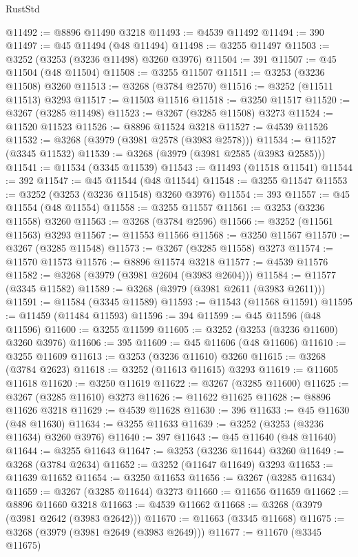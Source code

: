 \begin{lexlean}{RustStd}
\begin{coremodule}
@11492 := @8896 @11490 @3218
@11493 := @4539 @11492
@11494 := 390
@11497 := @45 @11494 (@48 @11494)
@11498 := @3255 @11497
@11503 := @3252 (@3253 (@3236 @11498) @3260 @3976)
@11504 := 391
@11507 := @45 @11504 (@48 @11504)
@11508 := @3255 @11507
@11511 := @3253 (@3236 @11508) @3260
@11513 := @3268 (@3784 @2570)
@11516 := @3252 (@11511 @11513) @3293
@11517 := @11503 @11516
@11518 := @3250 @11517
@11520 := @3267 (@3285 @11498)
@11523 := @3267 (@3285 @11508) @3273
@11524 := @11520 @11523
@11526 := @8896 @11524 @3218
@11527 := @4539 @11526
@11532 := @3268 (@3979 (@3981 @2578 (@3983 @2578)))
@11534 := @11527 (@3345 @11532)
@11539 := @3268 (@3979 (@3981 @2585 (@3983 @2585)))
@11541 := @11534 (@3345 @11539)
@11543 := @11493 (@11518 @11541)
@11544 := 392
@11547 := @45 @11544 (@48 @11544)
@11548 := @3255 @11547
@11553 := @3252 (@3253 (@3236 @11548) @3260 @3976)
@11554 := 393
@11557 := @45 @11554 (@48 @11554)
@11558 := @3255 @11557
@11561 := @3253 (@3236 @11558) @3260
@11563 := @3268 (@3784 @2596)
@11566 := @3252 (@11561 @11563) @3293
@11567 := @11553 @11566
@11568 := @3250 @11567
@11570 := @3267 (@3285 @11548)
@11573 := @3267 (@3285 @11558) @3273
@11574 := @11570 @11573
@11576 := @8896 @11574 @3218
@11577 := @4539 @11576
@11582 := @3268 (@3979 (@3981 @2604 (@3983 @2604)))
@11584 := @11577 (@3345 @11582)
@11589 := @3268 (@3979 (@3981 @2611 (@3983 @2611)))
@11591 := @11584 (@3345 @11589)
@11593 := @11543 (@11568 @11591)
@11595 := @11459 (@11484 @11593)
@11596 := 394
@11599 := @45 @11596 (@48 @11596)
@11600 := @3255 @11599
@11605 := @3252 (@3253 (@3236 @11600) @3260 @3976)
@11606 := 395
@11609 := @45 @11606 (@48 @11606)
@11610 := @3255 @11609
@11613 := @3253 (@3236 @11610) @3260
@11615 := @3268 (@3784 @2623)
@11618 := @3252 (@11613 @11615) @3293
@11619 := @11605 @11618
@11620 := @3250 @11619
@11622 := @3267 (@3285 @11600)
@11625 := @3267 (@3285 @11610) @3273
@11626 := @11622 @11625
@11628 := @8896 @11626 @3218
@11629 := @4539 @11628
@11630 := 396
@11633 := @45 @11630 (@48 @11630)
@11634 := @3255 @11633
@11639 := @3252 (@3253 (@3236 @11634) @3260 @3976)
@11640 := 397
@11643 := @45 @11640 (@48 @11640)
@11644 := @3255 @11643
@11647 := @3253 (@3236 @11644) @3260
@11649 := @3268 (@3784 @2634)
@11652 := @3252 (@11647 @11649) @3293
@11653 := @11639 @11652
@11654 := @3250 @11653
@11656 := @3267 (@3285 @11634)
@11659 := @3267 (@3285 @11644) @3273
@11660 := @11656 @11659
@11662 := @8896 @11660 @3218
@11663 := @4539 @11662
@11668 := @3268 (@3979 (@3981 @2642 (@3983 @2642)))
@11670 := @11663 (@3345 @11668)
@11675 := @3268 (@3979 (@3981 @2649 (@3983 @2649)))
@11677 := @11670 (@3345 @11675)

\end{coremodule}
\end{lexlean}
